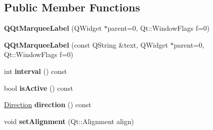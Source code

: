 \subsection*{Public Member Functions}
\begin{DoxyCompactItemize}
\item 
\mbox{\label{class_q_qt_marquee_label_a9f1481ebb4cf2e0fbca8ef8bcd2448eb}} 
{\bfseries Q\+Qt\+Marquee\+Label} (Q\+Widget $\ast$parent=0, Qt\+::\+Window\+Flags f=0)
\item 
\mbox{\label{class_q_qt_marquee_label_a2914699962cfbc90dafab2973b6a17c6}} 
{\bfseries Q\+Qt\+Marquee\+Label} (const Q\+String \&text, Q\+Widget $\ast$parent=0, Qt\+::\+Window\+Flags f=0)
\item 
\mbox{\label{class_q_qt_marquee_label_a5c4fb3fd55fe44fc73c4380ebf5b86ae}} 
int {\bfseries interval} () const
\item 
\mbox{\label{class_q_qt_marquee_label_add68930eb21723a33b905a74a60097b3}} 
bool {\bfseries is\+Active} () const
\item 
\mbox{\label{class_q_qt_marquee_label_ac40f57b905a35dcb0f59f478f2aaa39e}} 
\mbox{\hyperlink{class_q_qt_marquee_label_a9c93af95a748dfd57f793883281822a7}{Direction}} {\bfseries direction} () const
\item 
\mbox{\label{class_q_qt_marquee_label_a9493dcf19f1afd31fcf6d3a47bdce109}} 
void {\bfseries set\+Alignment} (Qt\+::\+Alignment align)
\end{DoxyCompactItemize}
